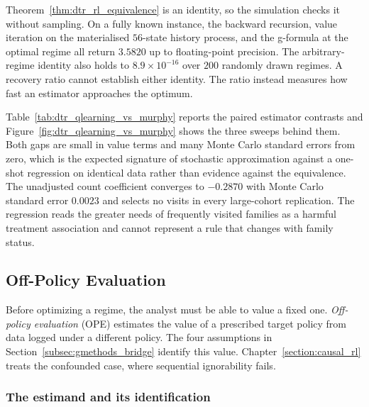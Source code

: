 Theorem~\ref{thm:dtr_rl_equivalence} is an identity, so the simulation checks it without sampling. On a fully known instance, the backward recursion, value iteration on the materialised $56$-state history process, and the g-formula at the optimal regime all return $3.5820$ up to floating-point precision. The arbitrary-regime identity also holds to $8.9\times10^{-16}$ over $200$ randomly drawn regimes. A recovery ratio cannot establish either identity. The ratio instead measures how fast an estimator approaches the optimum.

Table~\ref{tab:dtr_qlearning_vs_murphy} reports the paired estimator contrasts and Figure~\ref{fig:dtr_qlearning_vs_murphy} shows the three sweeps behind them. Both gaps are small in value terms and many Monte Carlo standard errors from zero, which is the expected signature of stochastic approximation against a one-shot regression on identical data rather than evidence against the equivalence. The unadjusted count coefficient converges to $-0.2870$ with Monte Carlo standard error $0.0023$ and selects no visits in every large-cohort replication. The regression reads the greater needs of frequently visited families as a harmful treatment association and cannot represent a rule that changes with family status.

\subsection{Off-Policy Evaluation}
\label{subsec:ope}

Before optimizing a regime, the analyst must be able to value a fixed one. \emph{Off-policy evaluation} (OPE) estimates the value of a prescribed target policy from data logged under a different policy. The four assumptions in Section~\ref{subsec:gmethods_bridge} identify this value. Chapter~\ref{section:causal_rl} treats the confounded case, where sequential ignorability fails.

\subsubsection*{The estimand and its identification}

